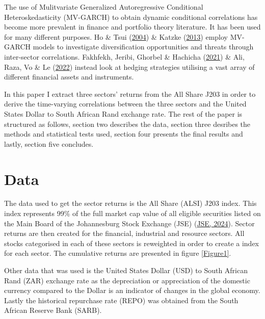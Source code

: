 \documentclass[12pt,preprint, authoryear]{elsarticle}
\numberwithin{equation}{section}
\numberwithin{figure}{section}
\numberwithin{table}{section}
\begin{document}
The use of Mulitvariate Generalized Autoregressive Conditional
Heteroskedasticity (MV-GARCH) to obtain dynamic conditional correlations
has become more prevalent in finance and portfolio theory literature. It
has been used for many different purposes. Ho \& Tsui
(\protect\hyperlink{ref-ho2004analysis}{2004}) \& Katzke
(\protect\hyperlink{ref-katzke2013south}{2013}) employ MV-GARCH models
to investigate diversification opportunities and threats through
inter-sector correlations. Fakhfekh, Jeribi, Ghorbel \& Hachicha
(\protect\hyperlink{ref-fakhfekh2021hedging}{2021}) \& Ali, Raza, Vo \&
Le (\protect\hyperlink{ref-ali2022modelling}{2022}) instead look at
hedging strategies utilising a vast array of different financial assets
and instruments.

In this paper I extract three sectors' returns from the All Share J203
in order to derive the time-varying correlations between the three
sectors and the United States Dollar to South African Rand exchange
rate. The rest of the paper is structured as follows, section two
describes the data, section three desribes the methods and statistical
tests used, section four presents the final results and lastly, section
five concludes.

\hypertarget{data}{%
\section{Data}\label{data}}

The data used to get the sector returns is the All Share (ALSI) J203
index. This index represents 99\% of the full market cap value of all
eligible securities listed on the Main Board of the Johannesburg Stock
Exchange (JSE) (\protect\hyperlink{ref-jse_website}{JSE, 2024}). Sector
returns are then created for the financial, industrial and resource
sectors. All stocks categorised in each of these sectors is reweighted
in order to create a index for each sector. The cumulative returns are
presented in figure \ref{Figure1}.

Other data that was used is the United States Dollar (USD) to South
African Rand (ZAR) exchange rate as the depreciation or appreciation of
the domestic currency compared to the Dollar is an indicator of changes
in the global economy. Lastly the historical repurchase rate (REPO) was
obtained from the South African Reserve Bank (SARB).
\end{document}
